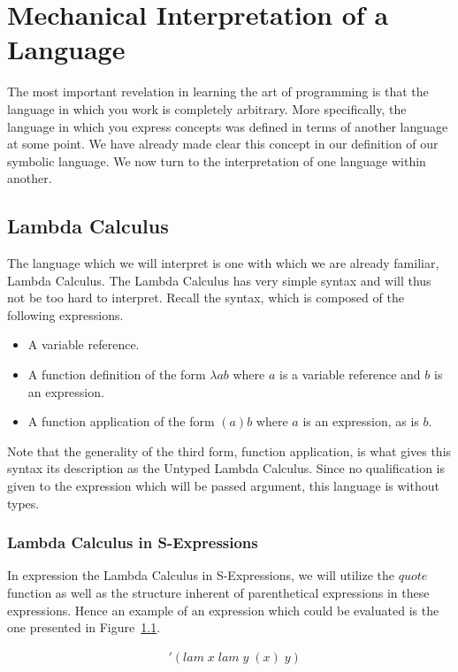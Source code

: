 
\chapter{Mechanical Interpretation of a Language}
The most important revelation in learning the art of programming is that the 
language in which you work is completely arbitrary. More specifically, the 
language in which you express concepts was defined in terms of another language 
at some point. We have already made clear this concept in our definition of our 
symbolic language. We now turn to the interpretation of one language within 
another.

\section{Lambda Calculus}
The language which we will interpret is one with which we are already familiar, 
Lambda Calculus. The Lambda Calculus has very simple syntax and will thus not 
be too hard to interpret. Recall the syntax, which is composed of the following 
expressions.

\begin{itemize}
  \item A variable reference.
  \item A function definition of the form $\lambda a b$ where $a$ is a variable reference and $b$ is an expression.
  \item A function application of the form $(a)b$ where $a$ is an expression, as is $b$.
\end{itemize}

Note that the generality of the third form, function application, is what gives 
this syntax its description as the Untyped Lambda Calculus. Since no 
qualification is given to the expression which will be passed argument, this 
language is without types.

\subsection{Lambda Calculus in S-Expressions}
In expression the Lambda Calculus in S-Expressions, we will utilize the $quote$ 
function as well as the structure inherent of parenthetical expressions in these 
expressions. Hence an example of an expression which could be evaluated is the
one presented in Figure~\ref{fig:sexprLambda}.

\begin{figure}[htp]
\caption{}\label{fig:sexprLambda}
\begin{align*}
& '(lam \; x \; lam \; y \; (x) \; y)
\end{align*}
\end{figure}

